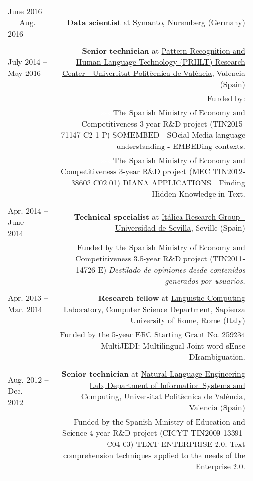 \documentclass[10pt]{article}
\begin{document}
\begin{tabular}{L!{\VRule}R}
June 2016 -- ~~~Aug. 2016 ~~&{\textbf{Data scientist} at \href{https://www.symanto.com/}{Symanto}, Nuremberg (Germany)}\\&\\

July 2014 -- May 2016 ~~&{\textbf{Senior technician} at \href{http://www.prhlt.upv.es/}{Pattern Recognition and Human Language Technology (PRHLT) Research Center - Universitat Polit{\`e}cnica de Val{\`e}ncia}, Valencia (Spain)}\\
&\scriptsize{Funded by:}\\
&\scriptsize{\textcolor{white}{ssss}The Spanish Ministry of Economy and Competitiveness 3-year R\&D project (TIN2015-71147-C2-1-P) SOMEMBED - SOcial Media language 
understanding - EMBEDing contexts.}\\
&\scriptsize{\textcolor{white}{ssss}The Spanish Ministry of Economy and Competitiveness 3-year R\&D project (MEC TIN2012-38603-C02-01) DIANA-APPLICATIONS - Finding Hidden Knowledge 
in Text.}\\&\\

Apr. 2014 -- June 2014~~~~&{\textbf{Technical specialist} at \href{http://www.lsi.us.es/italica/}{It{\'a}lica Research Group - Universidad de Sevilla}, Seville (Spain)}\\
&\scriptsize{Funded by the Spanish Ministry of Economy and Competitiveness 3.5-year R\&D project (TIN2011-14726-E) \emph{Destilado de opiniones desde contenidos generados por 
usuarios.}}\\&\\
 
Apr. 2013 -- Mar. 2014 ~~&{\textbf{Research fellow} at \href{http://lcl.uniroma1.it/index.html}{Linguistic Computing Laboratory, Computer Science Department, Sapienza University of Rome}, Rome (Italy)}\\
&\scriptsize{Funded by the 5-year ERC Starting Grant No. 259234 MultiJEDI: Multilingual Joint word sEnse DIsambiguation.}\\&\\

Aug. 2012 -- Dec. 2012~~~~&{\textbf{Senior technician} at \href{http://users.dsic.upv.es/grupos/nle/}{Natural Language Engineering Lab, Department of Information Systems and Computing, Universitat Polit{\`e}cnica de Val{\`e}ncia}, Valencia (Spain)}\\
&\scriptsize{Funded by the Spanish Ministry of Education and Science 4-year R\&D project (CICYT TIN2009-13391-C04-03) TEXT-ENTERPRISE 2.0: Text comprehension techniques
applied to the needs of the Enterprise 2.0.}\\&\\
\end{tabular}
\end{document}
